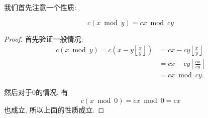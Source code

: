 \documentclass{ctexart}
\begin{document}
我们首先注意一个性质: 

\begin{prop}
    $$
c(x \bmod y)=c x \bmod c y
$$
    
\end{prop}

\begin{proof}
    首先验证一般情况: 
    $$
\begin{aligned}
c(x \bmod y)=c\left(x-y\left\lfloor\frac{x}{y}\right\rfloor\right) & =c x-c y\left\lfloor\frac{x}{y}\right\rfloor \\
& =c x-c y\left\lfloor\frac{c x}{c y}\right\rfloor \\
& =c x \bmod c y .
\end{aligned}
$$

然后对于0的情况, 有
$$
c(x \bmod 0)=c x \bmod 0=c x
$$
也成立, 所以上面的性质成立. 
\end{proof}
\end{document}
